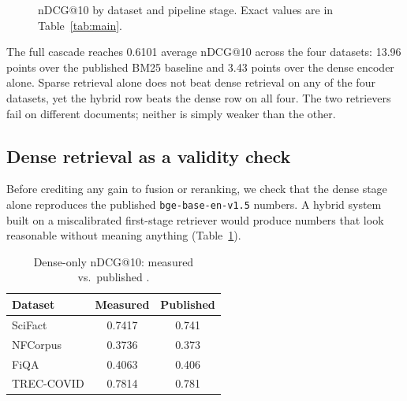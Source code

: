 \documentclass[11pt]{article}
\begin{document}
\begin{figure}[htbp]
\centering
{}
\caption{nDCG@10 by dataset and pipeline stage. Exact values are in Table~\ref{tab:main}.}
\label{fig:main-results}
\end{figure}

The full cascade reaches 0.6101 average nDCG@10 across the four datasets: 13.96 points over the published BM25 baseline and 3.43 points over the dense encoder alone. Sparse retrieval alone does not beat dense retrieval on any of the four datasets, yet the hybrid row beats the dense row on all four. The two retrievers fail on different documents; neither is simply weaker than the other.

\subsection{Dense retrieval as a validity check}
\label{sec:canary}

Before crediting any gain to fusion or reranking, we check that the dense stage alone reproduces the published \texttt{bge-base-en-v1.5} numbers. A hybrid system built on a miscalibrated first-stage retriever would produce numbers that look reasonable without meaning anything (Table~\ref{tab:canary}).

\begin{table}[h]
\centering
\caption{Dense-only nDCG@10: measured vs.\ published \citep{bge2023}.}
\label{tab:canary}
\begin{tabular}{lcc}
\toprule
Dataset & Measured & Published \\
\midrule
SciFact & 0.7417 & 0.741 \\
NFCorpus & 0.3736 & 0.373 \\
FiQA & 0.4063 & 0.406 \\
TREC-COVID & 0.7814 & 0.781 \\
\bottomrule
\end{tabular}
\end{table}
\end{document}
